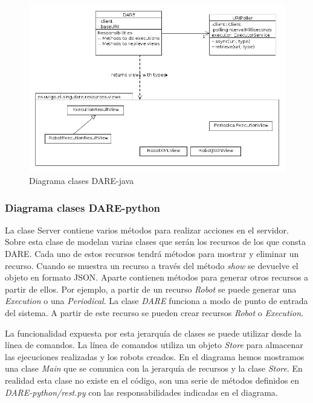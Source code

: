 \begin{figure}[hp]
\includegraphics[width=\textwidth]{chapters/technical-manual/diagrams/clases_dare_java.png}
\caption{Diagrama clases DARE-java}\label{diagrama_clases_dare_java}
\end{figure}

\subsubsection{Diagrama clases DARE-python}

La clase Server contiene varios métodos para realizar acciones en el
servidor. Sobre esta clase de modelan varias clases que serán los
recursos de los que consta DARE. Cada uno de estos recursos tendrá
métodos para mostrar y eliminar un recurso. Cuando se muestra un
recurso a través del método \emph{show} se devuelve el objeto en
formato JSON. Aparte contienen métodos para generar otros recursos a
partir de ellos. Por ejemplo, a partir de un recurso \emph{Robot} se
puede generar una \emph{Execution} o una \emph{Periodical}. La clase
\emph{DARE} funciona a modo de punto de entrada del sistema. A partir
de este recurso se pueden crear recursos \emph{Robot} o
\emph{Execution}.

La funcionalidad expuesta por esta jerarquía de clases se puede
utilizar desde la línea de comandos. La línea de comandos utiliza un
objeto \emph{Store} para almacenar las ejecuciones realizadas y los
robots creados. En el diagrama hemos mostramos una clase \emph{Main}
que se comunica con la jerarquía de recursos y la clase
\emph{Store}. En realidad esta clase no existe en el código, son una
serie de métodos definidos en \emph{DARE-python/rest.py} con las
responsabilidades indicadas en el diagrama.

